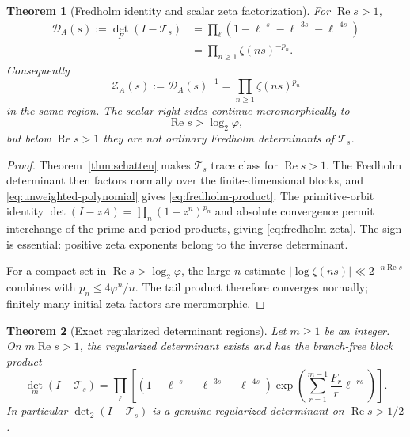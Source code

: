 \documentclass[11pt]{article}
\numberwithin{equation}{section}
\newtheorem{theorem}{Theorem}[section]
\theoremstyle{remark}
\newcommand{\RePart}{\operatorname{Re}}
\newcommand{\cT}{\mathcal T}
\newcommand{\cZ}{\mathcal Z}
\newcommand{\cD}{\mathcal D}
\begin{document}
\begin{theorem}[Fredholm identity and scalar zeta factorization]
\label{thm:fredholm}
For \(\RePart s>1\),
\begin{align}
 \cD_A(s):=\det_F(I-\cT_s)
 &=\prod_{\ell}
 \left(1-\ell^{-s}-\ell^{-3s}-\ell^{-4s}\right)
 \label{eq:fredholm-product}\\
 &=\prod_{n\ge1}\zeta(ns)^{-p_n}.
 \label{eq:fredholm-zeta}
\end{align}
Consequently
\begin{equation}
 \cZ_A(s):=\cD_A(s)^{-1}
 =\prod_{n\ge1}\zeta(ns)^{p_n}
 \label{eq:inverse-zeta-product}
\end{equation}
in the same region.  The scalar right sides continue meromorphically to
\begin{equation}
 \RePart s>\log_2\varphi,
 \label{eq:scalar-continuation-region}
\end{equation}
but below \(\RePart s>1\) they are not ordinary Fredholm determinants of
\(\cT_s\).
\end{theorem}

\begin{proof}
Theorem~\ref{thm:schatten} makes \(\cT_s\) trace class for
\(\RePart s>1\).  The Fredholm determinant then factors normally over the
finite-dimensional blocks, and \eqref{eq:unweighted-polynomial} gives
\eqref{eq:fredholm-product}.  The primitive-orbit identity
\(
\det(I-zA)=\prod_n(1-z^n)^{p_n}
\)
and absolute convergence permit interchange of the prime and period products,
giving \eqref{eq:fredholm-zeta}.  The sign is essential: positive zeta
exponents belong to the inverse determinant.

For a compact set in \(\RePart s>\log_2\varphi\), the large-\(n\) estimate
\(
|\log\zeta(ns)|\ll2^{-n\RePart s}
\)
combines with \(p_n\le4\varphi^n/n\).  The tail product therefore converges
normally; finitely many initial zeta factors are meromorphic.
\end{proof}

\begin{theorem}[Exact regularized determinant regions]
\label{thm:regularized}
Let \(m\ge1\) be an integer.  On \(m\RePart s>1\), the regularized
determinant exists and has the branch-free block product
\begin{equation}
 \det_m(I-\cT_s)
 =\prod_{\ell}
 \left[
  \left(1-\ell^{-s}-\ell^{-3s}-\ell^{-4s}\right)
  \exp\!\left(
   \sum_{r=1}^{m-1}\frac{F_r}{r}\ell^{-rs}
  \right)
 \right].
 \label{eq:regularized-product}
\end{equation}
In particular \(\det_2(I-\cT_s)\) is a genuine regularized determinant on
\(\RePart s>1/2\).
\end{theorem}
\end{document}
